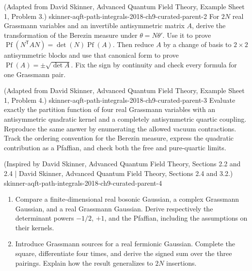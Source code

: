 \begin{enumerate}
  {(Adapted from David Skinner, Advanced Quantum Field Theory, Example Sheet 1, Problem 3.)}
  {skinner-aqft-path-integrals-2018-ch9-curated-parent-2}
For \(2N\) real Grassmann variables and an invertible antisymmetric matrix
\(A\), derive the transformation of the Berezin measure under
\(\theta=N\theta'\).  Use it to prove
\(\operatorname{Pf}(N^{\mathsf T}AN)=\det(N)\operatorname{Pf}(A)\).
Then reduce \(A\) by a change of basis to \(2\times2\) antisymmetric
blocks and use that canonical form to prove
\(\operatorname{Pf}(A)=\pm\sqrt{\det A}\).  Fix the sign by continuity
and check every formula for one Grassmann pair.

  {(Adapted from David Skinner, Advanced Quantum Field Theory, Example Sheet 1, Problem 4.)}
  {skinner-aqft-path-integrals-2018-ch9-curated-parent-3}
Evaluate exactly the partition function of four real Grassmann variables
with an antisymmetric quadratic kernel and a completely antisymmetric
quartic coupling.  Reproduce the same answer by enumerating the allowed
vacuum contractions.  Track the ordering convention for the Berezin measure,
express the quadratic contribution as a Pfaffian, and check both the free and
pure-quartic limits.

  {(Inspired by David Skinner, Advanced Quantum Field Theory, Sections 2.2 and 2.4 | David Skinner, Advanced Quantum Field Theory, Sections 2.4 and 3.2.)}
  {skinner-aqft-path-integrals-2018-ch9-curated-parent-4}
\begin{enumerate}
\item
Compare a finite-dimensional real bosonic Gaussian, a complex Grassmann
Gaussian, and a real Grassmann Gaussian.  Derive respectively the
determinant powers \(-1/2\), \(+1\), and the Pfaffian, including the
assumptions on their kernels.
\item
Introduce Grassmann sources for a real fermionic Gaussian.  Complete the
square, differentiate four times, and derive the signed sum over the three
pairings.  Explain how the result generalizes to \(2N\) insertions.
\end{enumerate}


\end{enumerate}
